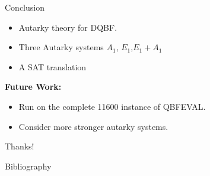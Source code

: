 \documentclass[xcolor=table	]{beamer}
\begin{document}
\begin{frame}{Conclusion}
\begin{itemize}
\item Autarky theory for DQBF.
\item Three Autarky systems $A_1$, $E_1$,$E_1 + A_1$
\item A SAT translation 
\end{itemize}
\vspace{0.5cm}
\textbf{Future Work: \newline}
\begin{itemize}
	\item Run on the complete 11600 instance of QBFEVAL.
	\item Consider more stronger autarky systems.
\end{itemize}
\vspace{0.5cm}
\Large
Thanks!
\end{frame}

\begin{frame}{Bibliography}


\end{frame}
\end{document}
